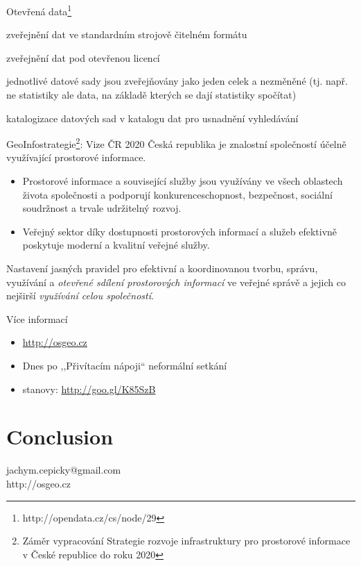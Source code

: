 \documentclass[xcolor=dvipsnames]{beamer}
\begin{document}
\begin{frame}{Otevřená data\footnote{http://opendata.cz/cs/node/29}}
\begin{description}[<+->]
    \item[Technická otevřenost:] zveřejnění dat ve standardním strojově čitelném formátu
    \item[Legislativní otevřenost:] zveřejnění dat pod otevřenou licencí
    \item[Dostupnost a původnost:] jednotlivé datové sady jsou zveřejňovány jako jeden celek a nezměněné (tj. např. ne statistiky ale data, na základě kterých se dají statistiky spočítat)
    \item[Přehlednost:] katalogizace datových sad v katalogu dat pro usnadnění vyhledávání
\end{description}
\end{frame}

\begin{frame}{GeoInfostrategie\footnote{Záměr vypracování Strategie rozvoje
    infrastruktury pro prostorové informace v České republice do roku 2020}: Vize ČR 2020}
 Česká republika je znalostní společností účelně využívající prostorové informace. 
\begin{itemize}
    \item Prostorové informace a související služby jsou využívány ve
        všech oblastech života společnosti a podporují konkurenceschopnost,
        bezpečnost, sociální soudržnost a trvale udržitelný rozvoj.
    \item Veřejný sektor díky dostupnosti prostorových informací a služeb
        efektivně poskytuje moderní a kvalitní veřejné služby. 
\end{itemize}
Nastavení jasných pravidel pro efektivní a koordinovanou tvorbu, správu,
využívání a \emph{otevřené sdílení prostorových informací} ve veřejné správě a jejich
co nejširší \emph{využívání celou společností}.
\end{frame}

\begin{frame}{Více informací}
\begin{itemize}
    \item \url{http://osgeo.cz}
    \item Dnes po ,,Přivítacím nápoji`` neformální setkání
    \item stanovy: \url{http://goo.gl/K85SzB}
\end{itemize}
\end{frame}


\section*{Conclusion}
\begin{frame}
    jachym.cepicky@gmail.com \\
    http://osgeo.cz
\end{frame}
\end{document}
